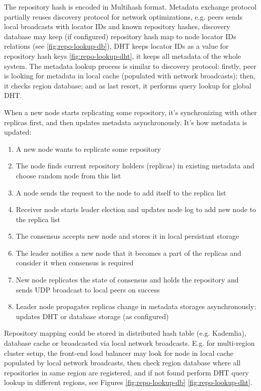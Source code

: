 \documentclass[12pt,oneside]{article}
\begin{document}
The repository hash is encoded in Multihash format. Metadata exchange protocol partially reuses
discovery protocol for network optimizations, e.g. peers sends local broadcasts
with locator IDs and known repository hashes, discovery database may keep (if configured)
repository hash map to node locator IDs relations (see \ref{fig:repo-lookup-db}),
DHT keeps locator IDs as a value for repository hash keys \ref{fig:repo-lookup-dht},
it keeps all metadata of the whole system. The metadata lookup process is similar to discovery protocol:
firstly, peer is looking for metadata in local cache (populated with network broadcasts); then, it checks
region database; and as last resort, it performs query lookup for global DHT.

When a new node starts replicating some repository, it's synchronizing with other replicas first, and then
updates metadata asynchronously. It's how metadata is updated:
\begin{enumerate}
  \item A new node wants to replicate some repository
  \item The node finds current repository holders (replicas) in existing metadata and choose random node from this list
  \item A node sends the request to the node to add itself to the replica list
  \item Receiver node starts leader election and updates node log to add new node to the replica list
  \item The consensus accepts new node and stores it in local persistant storage
  \item The leader notifies a new node that it becomes a part of the replicas and consider it when consensus is required
  \item New node replicates the state of consensus and holds the repository and sends UDP broadcast to
    local peers on success
  \item Leader node propagates replicas change in metadata storages asynchronously: updates DHT or database storage
    (as configured)
\end{enumerate}

Repository mapping could be stored in distributed hash table (e.g. Kademlia),
database cache or broadcasted via local network broadcasts.
E.g. for multi-region cluster setup, the front-end load balancer may look for node in local cache
populated by local network broadcasts, then check region database where all repositories in same region are
registered, and if not found perform DHT query lookup in different regions,
see Figures \ref{fig:repo-lookup-db} \ref{fig:repo-lookup-dht}.
\end{document}
